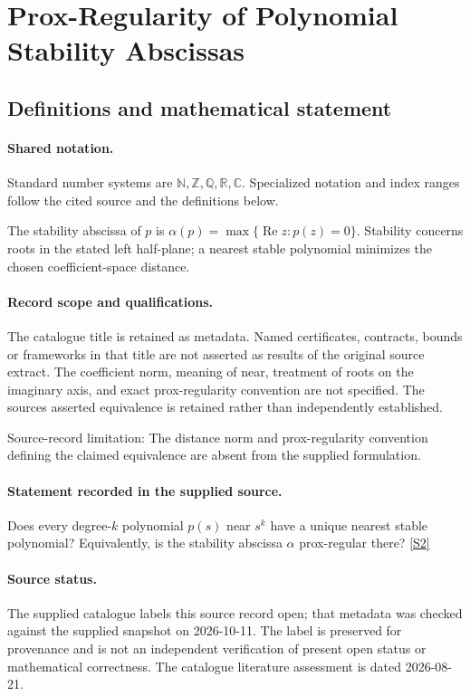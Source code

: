 \documentclass[11pt]{article}
\newcommand{\sref}[2]{\hyperlink{source:#1:#2}{[S#2]}}
\begin{document}
\section{Prox-Regularity of Polynomial Stability Abscissas}\label{statement}

\subsection{Definitions and mathematical statement}

\paragraph{Shared notation.}Standard number systems are $\mathbb N,\mathbb Z,\mathbb Q,\mathbb R,\mathbb C$. Specialized notation and index ranges follow the cited source and the definitions below.


The stability abscissa of $p$ is $\alpha(p)=\max\{\operatorname{Re}z:p(z)=0\}$. Stability concerns roots in the stated left half-plane; a nearest stable polynomial minimizes the chosen coefficient-space distance.
\paragraph{Record scope and qualifications.}
The catalogue title is retained as metadata. Named certificates, contracts, bounds or frameworks in that title are not asserted as results of the original source extract.
The coefficient norm, meaning of near, treatment of roots on the imaginary axis, and exact prox-regularity convention are not specified. The source\textquotesingle s asserted equivalence is retained rather than independently established.

Source-record limitation: The distance norm and prox-regularity convention defining the claimed equivalence are absent from the supplied formulation.
\paragraph{Statement recorded in the supplied source.}
Does every degree-$k$ polynomial $p(s)$ near $s^k$ have a unique nearest stable polynomial? Equivalently, is the stability abscissa $\alpha$ prox-regular there? \sref{statement}{2}
\paragraph{Source status.}
The supplied catalogue labels this source record open; that metadata was checked against the supplied snapshot on 2026-10-11. The label is preserved for provenance and is not an independent verification of present open status or mathematical correctness. The catalogue literature assessment is dated 2026-08-21.
\end{document}
